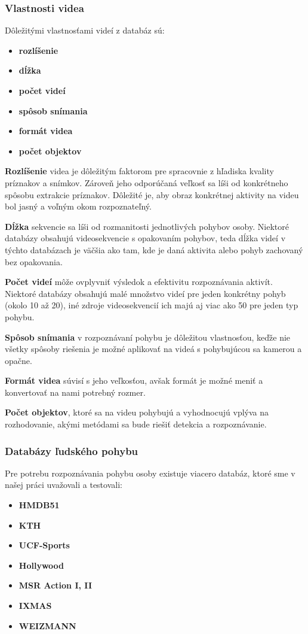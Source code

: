 \subsubsection{Vlastnosti videa} Dôležitými vlastnosťami videí z databáz sú:
\begin{itemize}
\item \textbf{rozlíšenie}
\item \textbf{dĺžka}
\item \textbf{počet videí}
\item \textbf{spôsob snímania}
\item \textbf{formát videa}
\item \textbf{počet objektov}
\end{itemize}

\textbf{Rozlíšenie} videa je dôležitým faktorom pre spracovnie z hľadiska kvality príznakov a snímkov. Zároveň jeho odporúčaná veľkosť sa líši od konkrétneho spôsobu extrakcie príznakov. Dôležité je, aby obraz konkrétnej aktivity na videu bol jasný a voľným okom rozpoznateľný.

\textbf{Dĺžka} sekvencie sa líši od rozmanitosti jednotlivých pohybov osoby. Niektoré databázy obsahujú videosekvencie s opakovaním pohybov, teda dĺžka videí v týchto databázach je väčšia ako tam, kde je daná aktivita alebo pohyb zachovaný bez opakovania.

\textbf{Počet videí} môže ovplyvniť výsledok a efektivitu rozpoznávania aktivít. Niektoré databázy obsahujú malé množstvo videí pre jeden konkrétny pohyb (okolo 10 až 20), iné zdroje videosekvencií ich majú aj viac ako 50 pre jeden typ pohybu.

\textbf{Spôsob snímania} v rozpoznávaní pohybu je dôležitou vlastnosťou, keďže nie všetky spôsoby riešenia je možné aplikovať na videá s pohybujúcou sa kamerou a opačne. 

\textbf{Formát videa} súvisí s jeho veľkosťou, avšak formát je možné meniť a konvertovať na nami potrebný rozmer.

\textbf{Počet objektov}, ktoré sa na videu pohybujú a vyhodnocujú vplýva na rozhodovanie, akými metódami sa bude riešiť detekcia a rozpoznávanie.

\subsubsection{Databázy ľudského pohybu}\label{dbludskeho}
Pre potrebu rozpoznávania pohybu osoby existuje viacero databáz, ktoré sme v našej práci uvažovali a testovali:
\begin{itemize}
\item \textbf{HMDB51}
\item \textbf{KTH}
\item \textbf{UCF-Sports}
\item \textbf{Hollywood}
\item \textbf{MSR Action I, II}
\item \textbf{IXMAS}
\item \textbf{WEIZMANN}
\end{itemize}

